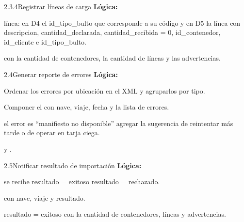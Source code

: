\begin{minispec}{2.3.4}{Registrar líneas de carga}
\textbf{Lógica:}
\begin{logica}
    \item {} línea:  en D4 el id\_tipo\_bulto que corresponde a su código
    y  en D5 la línea con descripcion, cantidad\_declarada, cantidad\_recibida =
    0, id\_contenedor, id\_cliente e id\_tipo\_bulto.
    \item {}  con la cantidad de contenedores, la cantidad de
    líneas y las advertencias.
\end{logica}
\end{minispec}

\begin{minispec}{2.4}{Generar reporte de errores}
\textbf{Lógica:}
\begin{logica}
    \item Ordenar los errores por ubicación en el XML y agruparlos por tipo.
    \item Componer el  con nave, viaje, fecha y la lista de errores.
    \item {} el error es ``manifiesto no disponible''  agregar la sugerencia
    de reintentar más tarde o de operar en tarja ciega.
    \item {}  y  .
\end{logica}
\end{minispec}

\begin{minispec}{2.5}{Notificar resultado de importación}
\textbf{Lógica:}
\begin{logica}
    \item {} se recibe   resultado = exitoso
     resultado = rechazado.
    \item {}  con nave, viaje y resultado.
    \item {} resultado = exitoso   con la
    cantidad de contenedores, líneas y advertencias.
\end{logica}
\end{minispec}

